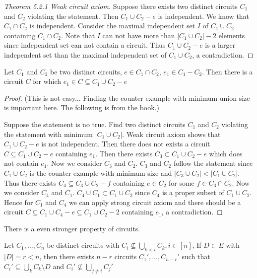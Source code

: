 \begin{proof}[Theorem 5.2.1 Weak circuit axiom]
    Suppose there exists two distinct circuits $C_1$ and $C_2$ violating the statement. Then $C_1\cup C_2-e$ is independent. We know that $C_1\cap C_2$ is independent. Consider the maximal independent set $I$ of $C_1\cup C_2$ containing $C_1\cap C_2$. Note that $I$ can not have more than $|C_1\cup C_2|-2$ elements since independent set can not contain a circuit. Thus $C_1\cup C_2 -e$ is a larger independent set than the maximal independent set of $C_1\cup C_2$, a contradiction.
\end{proof}

\begin{theorem}\label{thm:strongcircuit}
    Let $C_1$ and $C_2$ be two distinct circuits, $e\in C_1\cap C_2$, $e_1 \in C_1 - C_2$. Then
there is a circuit $C$ for which $e_1\in C\subseteq C_1\cup C_2 -e$
\end{theorem}
\begin{proof}
    (This is not easy... Finding the counter example with minimum union size is important here. The following is from the book.)

    Suppose the statement is no true.
    Find two distinct circuits $C_1$ and $C_2$ violating the statement with minimum $|C_1\cup C_2|$. Weak circuit axiom shows that $C_1 \cup C_2 -e$ is not independent. Then there does not exists a circuit $C\subseteq C_1\cup C_2 -e$ containing $e_1$. Then there exists $C_3\subset C_1\cup C_2 -e$ which does not contain $e_1$. Now we consider $C_3$ and $C_2$. $C_3$ and $C_2$ follow the statement since $C_1\cup C_2$ is the counter example with minimum size and $|C_3\cup C_2|<|C_1\cup C_2|$. Thus there exists $C_4 \subseteq C_3\cup C_2 -f$ containing $e\in C_2$ for some $f\in C_3\cap C_2$. Now we consider $C_4$ and $C_1$. $C_4\cup C_1 \subset C_1 \cup C_2$ since $C_4$ is a proper subset of $C_1\cup C_2$. Hence for $C_1$ and $C_4$ we can apply strong circuit axiom and there should be a circuit $C\subseteq C_1\cup C_4 -e\subseteq C_1\cup C_2-2$ containing $e_1$, a contradiction.
\end{proof}
There is a even stronger property of circuits.

\begin{lemma}\label{lem:asche}
    Let $C_1,\ldots,C_n$ be distinct circuits with $C_i\not\subseteq \bigcup_{k<i}C_k,i\in [n]$, If $D\subset E$ with $|D|=r<n$, then there exists $n-r$ circuits $C_1',\ldots,C_{n-r}'$ such that $C_i'\subseteq\bigcup_{k}C_k\setminus D$ and $C_i'\not\subseteq \bigcup_{j\not=i}C_j'$
\end{lemma}

